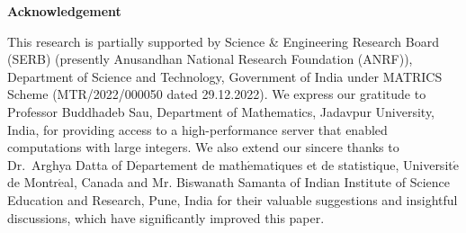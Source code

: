 \documentclass[11pt]{article}
\theoremstyle{definition}
\theoremstyle{remark}
\numberwithin{equation}{section}
\begin{document}
\vspace{2em}
\noindent
{\bf Acknowledgement}

\vspace{1em}
\noindent
This research is partially supported by Science \& Engineering Research Board (SERB) (presently Anusandhan National Research Foundation (ANRF)), Department of Science and Technology, Government of India under MATRICS Scheme (MTR/2022/000050 dated 29.12.2022). We express our gratitude to Professor Buddhadeb Sau, Department of Mathematics, Jadavpur University, India, for providing access to a high-performance server that enabled computations with large integers. We also extend our sincere thanks to Dr.~Arghya Datta of D$\acute{\text{e}}$partement de math$\acute{\text{e}}$matiques et de statistique, Universit$\acute{\text{e}}$ de Montr$\acute{\text{e}}$al, Canada and Mr. Biswanath Samanta of Indian Institute of Science Education and Research, Pune, India for their valuable suggestions and insightful discussions, which have significantly improved this paper.

\newpage
\end{document}
